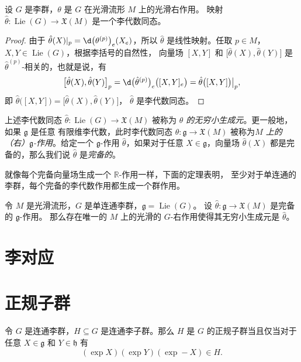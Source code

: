 \documentclass[fontset=none]{Notes}
\DeclareMathOperator\Lie{Lie}
\newcommand{\lie}[1]{\mathfrak{#1}}
\begin{document}
\begin{theorem}
  设 $G$ 是李群，$\theta$ 是 $G$ 在光滑流形 $M$ 上的光滑右作用。
  映射 $\hat \theta:\Lie(G)\to \mathfrak{X}(M)$ 是一个李代数同态。
\end{theorem} 
\begin{proof}
  由于 $\hat\theta(X)|_p=\d\bigl(\theta^{(p)}\bigr)_e(X_e)$，所以
  $\hat\theta$ 是线性映射。任取 $p\in M$，
  $X,Y\in\Lie(G)$，根据李括号的自然性，
  向量场 $[X,Y]$ 和 $\bigl[\hat\theta(X),\hat\theta(Y)\bigr]$
  是 $\hat\theta^{(p)}$-相关的，也就是说，有
  \[
    \bigl[\hat\theta(X),\hat\theta(Y)\bigr]_{p}
    =\d\bigl(\hat\theta^{(p)}\bigr)_e\bigl([X,Y]_e\bigr)
    =\hat\theta\bigl([X,Y]\bigr)\big|_{p},
  \]
  即 $\hat\theta\bigl([X,Y]\bigr)=\bigl[\hat\theta(X),\hat\theta(Y)\bigr]$，
  $\hat\theta$ 是李代数同态。
\end{proof}

上述李代数同态 $\hat\theta:\Lie(G)\to \mathfrak{X}(M)$ 被称为
\emph{$\theta$ 的无穷小生成元}。更一般地，如果 $\lie g$ 是任意
有限维李代数，此时李代数同态 $\hat\theta:\lie g\to \mathfrak{X}(M)$
被称为\emph{$M$ 上的（右）$\lie g$-作用}。给定一个 $\lie g$-作用
$\hat\theta$，如果对于任意 $X\in \lie g$，向量场 $\hat\theta(X)$
都是完备的，那么我们说 $\hat\theta$ 是\emph{完备的}。

就像每个完备向量场生成一个 $\mathbb{R}$-作用一样，下面的定理表明，
至少对于单连通的李群，每个完备的李代数作用都生成一个群作用。

\begin{theorem}[李代数作用上的基本定理]
  令 $M$ 是光滑流形，$G$ 是单连通李群，$\lie g=\Lie(G)$。
  设 $\hat\theta:\lie g\to \mathfrak{X}(M)$ 是完备的 $\lie g$-作用。
  那么存在唯一的 $M$ 上的光滑的 $G$-右作用使得其无穷小生成元是
  $\hat\theta$。
\end{theorem}

\section{李对应}


\section{正规子群}

\begin{lemma}
  令 $G$ 是连通李群，$H\subseteq G$ 是连通李子群。那么 $H$
  是 $G$ 的正规子群当且仅当对于任意 $X\in\lie g$ 和 $Y\in\lie h$ 有
  \begin{equation}
    (\exp X)(\exp Y)(\exp -X)\in H.
  \end{equation}
\end{lemma}
\end{document}
